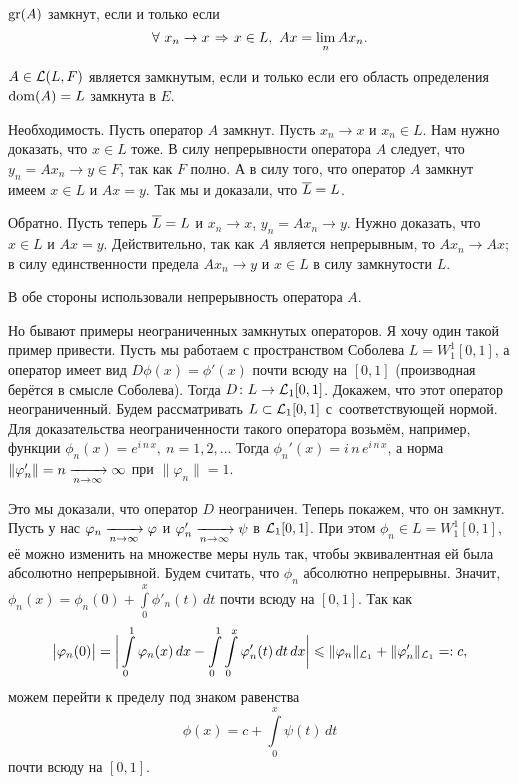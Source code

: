   $\operatorname{gr}(A)$  замкнут, если и только если 
\[
  \forall\ x_n\to x\imp x\in L,\ Ax =\lim\limits_n A x_n.
\]

\begin{The}
  $A\in \mathcal L(L,F)$ является замкнутым, если и только если его область определения $\operatorname{dom}(A) = L$ замкнута в $E$.
\end{The}
\begin{Proof}
  Необходимость. Пусть оператор $A$ замкнут. Пусть $x_n\to x$ и $x_n\in L$. Нам нужно доказать, что $x\in L$ тоже.
  В силу непрерывности оператора $A$ следует, что $y_n = Ax_n\to y\in F$, так как $F$ полно. А в силу того, что оператор $A$ замкнут имеем $x\in L$ и $Ax = y$. Так мы и доказали, что $\overline{L}=L$.

Обратно. Пусть теперь $\overline{L}=L$ и $x_n\to x$, $y_n=Ax_n\to y$. Нужно доказать, что $x\in L$ и $Ax = y$. Действительно, так как $A$ является непрерывным, то $A x_n\to Ax$; в силу единственности предела $A x_n\to y$ и $x\in L$ в силу замкнутости $L$.
\end{Proof}

В обе стороны использовали непрерывность оператора $A$.

Но бывают примеры неограниченных замкнутых операторов. Я хочу один такой пример привести.
Пусть мы работаем с пространством Соболева $L = W_1^1[0,1]$, а оператор имеет вид $D\phi(x) = \phi'(x)$ почти всюду на $[0,1]$ (производная берётся в смысле Соболева). Тогда $D\colon L\rightarrow \mathcal L_1[0,1]$. Докажем, что этот оператор неограниченный. Будем рассматривать $L\subset \mathcal L_1[0,1]$ с~соответствующей нормой. Для доказательства неограниченности такого оператора возьмём, например, функции $\phi_n(x)= e^{i\,n\,x},\ n=1,2,\dots$ Тогда $\phi_n'(x) = i\,n\,e^{i\,n\,x}$, а норма $\|\varphi'_n\| = n\xrightarrow[n\rightarrow\infty]{}\infty$ при $\|\varphi_n\|=1$.

Это мы доказали, что оператор $D$ неограничен. Теперь покажем, что он замкнут.  Пусть у нас $\varphi_n\xrightarrow[n\rightarrow\infty]{}\varphi$ и $\varphi'_n\xrightarrow[n\rightarrow\infty]{}\psi$ в $\mathcal L_1[0,1]$. При этом $\phi_n\in L = W_1^1[0,1]$, её можно изменить на множестве меры нуль так, чтобы эквивалентная ей была абсолютно непрерывной.
Будем считать, что $\phi_n$ абсолютно непрерывны. Значит, $\phi_n(x) = \phi_n(0) + \int\limits_0^x\phi'_n(t)\,dt$ почти всюду на $[0,1]$. Так как 
\[
\big|\varphi_n(0)\big|= \bigg|\int\limits_0^1\varphi_n(x)\,dx - \int\limits_0^1 \int\limits_0^x\varphi'_n(t)\,dt\,dx\bigg|\leqslant \|\varphi_n\|_{\mathcal L_1}+\|\varphi'_n\|_{\mathcal L_1}=:c,
\]
можем перейти к пределу под знаком равенства
\[
  \phi(x) = c + \int\limits_0^x\psi(t)\,dt
\]
почти всюду на $[0,1]$.

